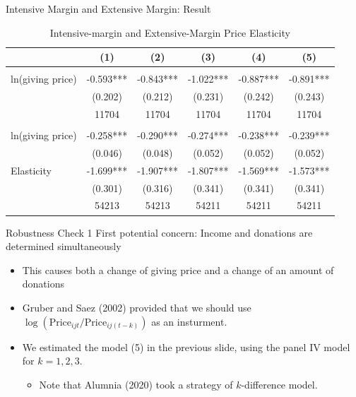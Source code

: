 \documentclass[
  ignorenonframetext,
]{beamer}
\providecommand{\tightlist}{%
  \setlength{\itemsep}{0pt}\setlength{\parskip}{0pt}}
\begin{document}
\begin{frame}{Intensive Margin and Extensive Margin: Result}
\protect\hypertarget{intensive-margin-and-extensive-margin-result}{}
\begin{table}

\caption{\label{tab:kableEstimateElasticityIntExt}Intensive-margin and Extensive-Margin Price Elasticity}
\centering
\fontsize{8}{10}\selectfont
\begin{tabular}[t]{lccccc}
\toprule
 & (1) & (2) & (3) & (4) & (5)\\
\midrule
\addlinespace[0.3em]
\multicolumn{6}{l}{\textbf{Intensive Margin}}\\
\hspace{1em}ln(giving price) & -0.593*** & -0.843*** & -1.022*** & -0.887*** & -0.891***\\
\hspace{1em} & (0.202) & (0.212) & (0.231) & (0.242) & (0.243)\\
\hspace{1em} & 11704 & 11704 & 11704 & 11704 & 11704\\
\addlinespace[0.3em]
\multicolumn{6}{l}{\textbf{Extensive Margin}}\\
\hspace{1em}ln(giving price) & -0.258*** & -0.290*** & -0.274*** & -0.238*** & -0.239***\\
\hspace{1em} & (0.046) & (0.048) & (0.052) & (0.052) & (0.052)\\
\hspace{1em}Elasticity & -1.699*** & -1.907*** & -1.807*** & -1.569*** & -1.573***\\
 & (0.301) & (0.316) & (0.341) & (0.341) & (0.341)\\
 & 54213 & 54213 & 54211 & 54211 & 54211\\
\bottomrule
\end{tabular}
\end{table}
\end{frame}

\begin{frame}{Robustness Check 1}
\protect\hypertarget{robustness-check-1}{}
First potential concern: Income and donations are determined
simultaneously

\begin{itemize}
\tightlist
\item
  This causes both a change of giving price and a change of an amount of
  donations
\item
  Gruber and Saez (2002) provided that we should use
  \(\log(\text{Price}_{ijt}/\text{Price}_{ij(t-k)})\) as an insturment.
\item
  We estimated the model (5) in the previous slide, using the panel IV
  model for \(k = 1, 2, 3\).

  \begin{itemize}
  \tightlist
  \item
    Note that Alumnia (2020) took a strategy of \(k\)-difference model.
  \end{itemize}
\end{itemize}
\end{frame}
\end{document}
